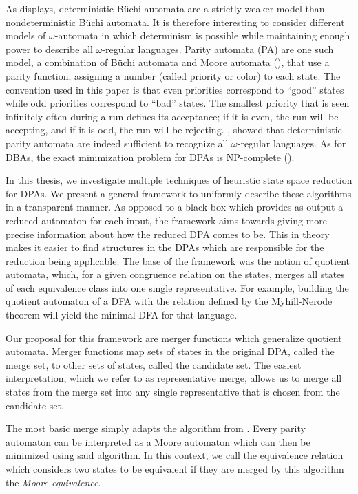 As \cite{Thomas1991} displays, deterministic B\"uchi automata are a strictly weaker model than nondeterministic Büchi automata. It is therefore interesting to consider different models of $\omega$-automata in which determinism is possible while maintaining enough power to describe all $\omega$-regular languages. 
Parity automata (PA) are one such model, a combination of B\"uchi automata and Moore automata (\cite{Moore56}), that use a parity function, assigning a number (called priority or color) to each state. The convention used in this paper is that even priorities correspond to \enquote{good} states while odd priorities correspond to \enquote{bad} states. The smallest priority that is seen infinitely often during a run defines its acceptance; if it is even, the run will be accepting, and if it is odd, the run will be rejecting.
\cite{Mostowski1991}, \cite{Thomas1997} showed that deterministic parity automata are indeed sufficient to recognize all $\omega$-regular languages. As for DBAs, the exact minimization problem for DPAs is NP-complete (\cite{Schewe2010}).
\vspace{5pt}

In this thesis, we investigate multiple techniques of heuristic state space reduction for DPAs. We present a general framework to uniformly describe these algorithms in a transparent manner. As opposed to a black box which provides as output a reduced automaton for each input, the framework aims towards giving more precise information about how the reduced DPA comes to be. This in theory makes it easier to find structures in the DPAs which are responsible for the reduction being applicable.
The base of the framework was the notion of quotient automata, which, for a given congruence relation on the states, merges all states of each equivalence class into one single representative. For example, building the quotient automaton of a DFA with the relation defined by the Myhill-Nerode theorem \cite{} will yield the minimal DFA for that language.

Our proposal for this framework are merger functions which generalize quotient automata. Merger functions map sets of states in the original DPA, called the merge set, to other sets of states, called the candidate set. The easiest interpretation, which we refer to as representative merge, allows us to merge all states from the merge set into any single representative that is chosen from the candidate set.

The most basic merge simply adapts the algorithm from \cite{Hopcroft1971}. Every parity automaton can be interpreted as a Moore automaton which can then be minimized using said algorithm. In this context, we call the equivalence relation which considers two states to be equivalent if they are merged by this algorithm the \emph{Moore equivalence}. 

